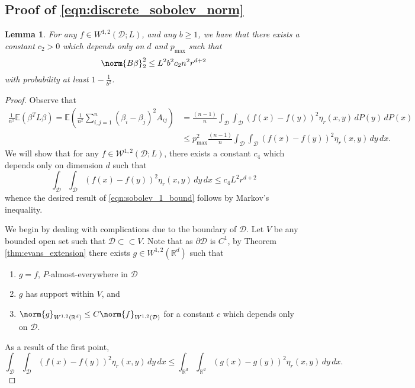 \documentclass{article}
\newcommand{\Reals}{\mathbb{R}}
\newcommand{\1}{\mathbf{1}}
\newcommand{\D}{\mathcal{D}}
\newcommand{\Rd}{\Reals^d}
\newcommand{\Ebb}{\mathbb{E}}
\theoremstyle{alden}
\theoremstyle{aldenthm}
\newtheorem{lemma}{Lemma}
\theoremstyle{definition}
\theoremstyle{remark}
\begin{document}
\subsection{Proof of \eqref{eqn:discrete_sobolev_norm}}

\begin{lemma}
	\label{lem:sobolev_1_bound}
	For any $f \in W^{1,2}(\mathcal{D};L)$, and any $b \geq 1$, we have that there exists a constant $c_2 > 0$ which depends only on $d$ and $p_{\max}$ such that
	\begin{equation}
	\label{eqn:sobolev_1_bound}
	\norm{B\beta}_2^2 \leq L^2 b^2 c_2 n^2 r^{d + 2}
	\end{equation}
	with probability at least $1 - \frac{1}{b^2}$. 
\end{lemma}
\begin{proof}
	Observe that
	\begin{align*}
	\frac{1}{n^2}\Ebb(\beta^T L \beta) = \Ebb\left(\frac{1}{n^2} \sum_{i,j = 1}^{n} (\beta_i - \beta_j)^2 A_{ij}\right) & = \frac{(n - 1)}{n} \int_{\D} \int_{\D} (f(x) - f(y))^2\eta_r(x,y) \,dP(y) \,dP(x) \\
	& \leq p_{\max}^2 \frac{(n - 1)}{n} \int_{\D} \int_{\D} (f(x) - f(y))^2\eta_r(x,y) \,dy \,dx.
	\end{align*}
	We will show that for any $f \in \mathcal{W}^{1,2}(\D;L)$, there exists a constant $c_4$ which depends only on dimension $d$ such that
	\begin{equation}
	\label{eqn:mean_bound}
	\int_{\D} \int_{\D} (f(x) - f(y))^2\eta_r(x,y) \,dy \,dx \leq c_4 L^2 r^{d + 2}
	\end{equation}
	whence the desired result of \eqref{eqn:sobolev_1_bound} follows by Markov's inequality.
	
	We begin by dealing with complications due to the boundary of $\mathcal{D}$. Let $V$ be any bounded open set such that $\D \subset \subset V$. Note that as $\partial \D$ is $C^1$, by Theorem \ref{thm:evans_extension} there exists $g \in W^{1,2}(\Reals^d)$ such that
	\begin{enumerate}
		\item
		\label{eqn:evans_extension_1}
		$g = f$, $P$-almost-everywhere in $\D$
		\item 
		$g$ has support within $V$, and  
		\item 
		\label{eqn:sobolev_1_bound_2}
		$\norm{g}_{W^{1,2}(\Rd)} \leq C \norm{f}_{W^{1,2}(\D)}$ for a constant $c$ which depends only on $\mathcal{D}$.
	\end{enumerate}
	As a result of the first point,
	\begin{equation}
	\label{eqn:sobolev_1_bound_1}
	\int_{\D} \int_{\D} (f(x) - f(y))^2\eta_r(x,y) \,dy \,dx \leq \int_{\Rd} \int_{\Rd} (g(x) - g(y))^2\eta_r(x,y) \,dy \,dx.
	\end{equation}
	

\end{proof}
\end{document}
